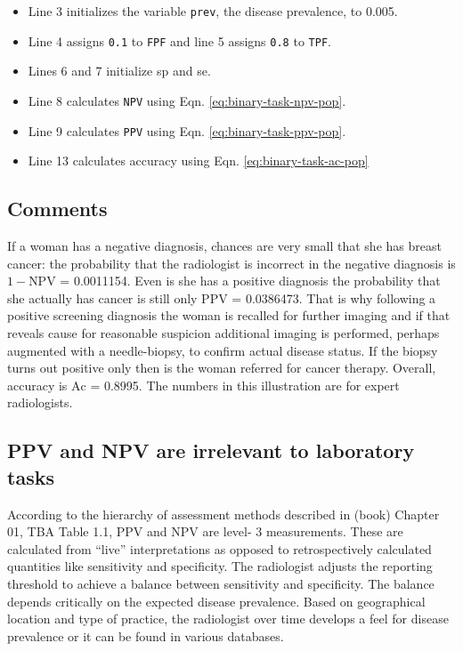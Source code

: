 \documentclass[
]{book}
\providecommand{\tightlist}{%
  \setlength{\itemsep}{0pt}\setlength{\parskip}{0pt}}
\begin{document}
\begin{itemize}
\tightlist
\item
  Line 3 initializes the variable \texttt{prev}, the disease prevalence, to 0.005.
\item
  Line 4 assigns \texttt{0.1} to \texttt{FPF} and line 5 assigns \texttt{0.8} to \texttt{TPF}.
\item
  Lines 6 and 7 initialize sp and se.
\item
  Line 8 calculates \texttt{NPV} using Eqn. \eqref{eq:binary-task-npv-pop}.
\item
  Line 9 calculates \texttt{PPV} using Eqn. \eqref{eq:binary-task-ppv-pop}.
\item
  Line 13 calculates accuracy using Eqn. \eqref{eq:binary-task-ac-pop}
\end{itemize}

\hypertarget{binary-task-npv-ppv-comments}{%
\subsection{Comments}\label{binary-task-npv-ppv-comments}}

If a woman has a negative diagnosis, chances are very small that she has breast cancer: the probability that the radiologist is incorrect in the negative diagnosis is \(1 - \text{NPV}\) = 0.0011154. Even is she has a positive diagnosis the probability that she actually has cancer is still only \(\text{PPV}\) = 0.0386473. That is why following a positive screening diagnosis the woman is recalled for further imaging and if that reveals cause for reasonable suspicion additional imaging is performed, perhaps augmented with a needle-biopsy, to confirm actual disease status. If the biopsy turns out positive only then is the woman referred for cancer therapy. Overall, accuracy is \(\text{Ac}\) = 0.8995. The numbers in this illustration are for expert radiologists.

\hypertarget{binary-task-npv-ppv-irrel-lab}{%
\subsection{PPV and NPV are irrelevant to laboratory tasks}\label{binary-task-npv-ppv-irrel-lab}}

According to the hierarchy of assessment methods described in (book) Chapter 01, TBA Table 1.1, \(\text{PPV}\) and \(\text{NPV}\) are level- 3 measurements. These are calculated from ``live'' interpretations as opposed to retrospectively calculated quantities like sensitivity and specificity. The radiologist adjusts the reporting threshold to achieve a balance between sensitivity and specificity. The balance depends critically on the expected disease prevalence. Based on geographical location and type of practice, the radiologist over time develops a feel for disease prevalence or it can be found in various databases.
\end{document}
